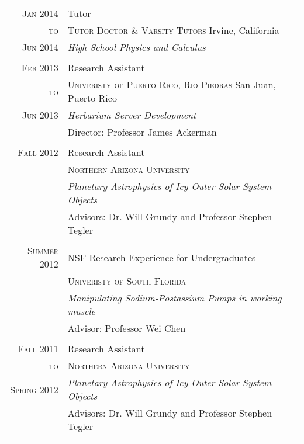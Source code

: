 \documentclass[letterpaper,10pt]{article} %
\begin{document}
\begin{tabularx}{\textwidth}{r|p{11cm}}

\textsc{Jan 2014} & Tutor \\
\textsc{to} & \textsc{Tutor Doctor \& Varsity Tutors} Irvine, California\\
\textsc{Jun 2014} &\emph{High School Physics and Calculus}\\ 

\multicolumn{2}{c}{} \\


\textsc{Feb 2013} & Research Assistant  \\
\textsc{to} & \textsc{Univeristy of Puerto Rico, Rio Piedras} San Juan, Puerto Rico\\
\textsc{Jun 2013} & \emph{Herbarium Server Development}\\ 
 & Director: Professor James Ackerman \\
\multicolumn{2}{c}{}\\


\textsc{Fall 2012} & Research Assistant \\
& \textsc{Northern Arizona University} \\
&\emph{Planetary Astrophysics of Icy Outer Solar System Objects}\\ 
& Advisors: Dr. Will Grundy and Professor Stephen Tegler \\
\multicolumn{2}{c}{} \\


\textsc{Summer 2012} & NSF Research Experience for Undergraduates \\
& \textsc{Univeristy of South Florida} \\
&\emph{Manipulating Sodium-Postassium Pumps in working muscle}\\ 
& Advisor: Professor Wei Chen \\
\multicolumn{2}{c}{} \\


\textsc{Fall 2011} & Research Assistant \\
\textsc{to} & \textsc{Northern Arizona University} \\
\textsc{Spring 2012} &\emph{Planetary Astrophysics of Icy Outer Solar System Objects}\\ 
& Advisors: Dr. Will Grundy and Professor Stephen Tegler \\
\multicolumn{2}{c}{} \\


\end{tabularx}
\end{document}
